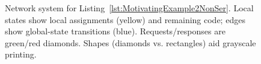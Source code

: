 \begin{figure}[!htbp]
\begin{tikzpicture}[
		node distance=1.5cm and 2.5cm,
		>=stealth,
		thick,
		every node/.style={font=\small}
	]
	\end{tikzpicture}
\caption{Network system for Listing~\ref{lst:MotivatingExample2NonSer}.
Local states show local assignments (yellow) and remaining code; edges show global-state transitions (blue). Requests/responses are green/red diamonds. Shapes (diamonds vs. rectangles) aid grayscale printing.}

\label{fig:code2ExampleNS}
\end{figure}
